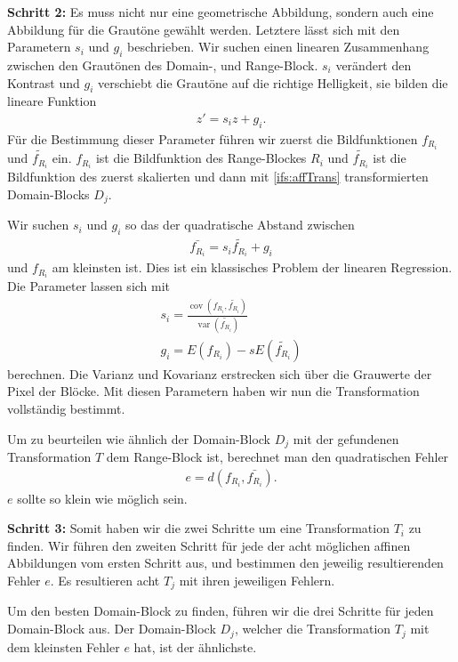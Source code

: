 \textbf{Schritt 2: }Es muss nicht nur eine geometrische Abbildung, sondern auch eine Abbildung für die Grautöne gewählt werden. Letztere lässt sich mit den Parametern $s_i$ und $g_i$ beschrieben.
Wir suchen einen linearen Zusammenhang zwischen den Grautönen des Domain-, und Range-Block. $s_i$ verändert den Kontrast und $g_i$ verschiebt die Grautöne auf die richtige Helligkeit, sie bilden die lineare Funktion
\begin{align*}
	z' = s_i z + g_i.
\end{align*}
Für die Bestimmung dieser Parameter führen wir zuerst die Bildfunktionen $f_{R_i}$ und $\tilde{f_{R_i}}$ ein.
$f_{R_i}$ ist die Bildfunktion des Range-Blockes $R_i$ und $\tilde{f_{R_i}}$ ist die Bildfunktion des zuerst skalierten und dann mit \eqref{ifs:affTrans} transformierten Domain-Blocks $D_j$.

Wir suchen $s_i$ und $g_i$ so das der quadratische Abstand zwischen 
\begin{align*}
	\bar{f_{R_i}} = s_i \tilde{f_{R_i}} + g_i
\end{align*}
und $f_{R_i}$ am kleinsten ist.
Dies ist ein klassisches Problem der linearen Regression. Die Parameter lassen sich mit
\begin{align*}	
	s_i = \frac{\operatorname{cov}(f_{R_i}, \tilde{f_{R_i}})}{\operatorname{var}(\tilde{f_{R_i}})} \\
	g_i = E(f_{R_i}) - s E(\tilde{f_{R_i}})
\end{align*}
berechnen.
Die Varianz und Kovarianz erstrecken sich über die Grauwerte der Pixel der Blöcke.
Mit diesen Parametern haben wir nun die Transformation vollständig bestimmt.

Um zu beurteilen wie ähnlich der Domain-Block $D_j$ mit der gefundenen Transformation $T$ dem Range-Block ist, berechnet man den quadratischen Fehler
\begin{align*}
	e = d(f_{R_i}, \bar{f_{R_i}}).
\end{align*}
$e$ sollte so klein wie möglich sein.

\textbf{Schritt 3: }
Somit haben wir die zwei Schritte um eine Transformation $T_i$ zu finden.
Wir führen den zweiten Schritt für jede der acht möglichen affinen Abbildungen vom ersten Schritt aus, und bestimmen den jeweilig resultierenden Fehler $e$.
Es resultieren acht $T_j$ mit ihren jeweiligen Fehlern.

Um den besten Domain-Block zu finden, führen wir die drei Schritte für jeden Domain-Block aus.
Der Domain-Block $D_j$, welcher die Transformation $T_j$ mit dem kleinsten Fehler $e$ hat, ist der ähnlichste.

